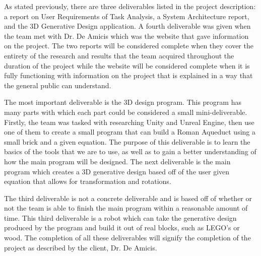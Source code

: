 \documentclass[letterpaper,draftclsnofoot,onecolumn,10 pt]{IEEEtran}
\begin{document}
As stated previously, there are three deliverables listed in the project description: a report on User Requirements of Task Analysis, a System Architecture report, and the 3D Generative Design application. A fourth deliverable was given when the team met with Dr. De Amicis which was the website that gave information on the project. The two reports will be considered complete when they cover the entirety of the research and results that the team acquired throughout the duration of the project while the website will be considered complete when it is fully functioning with information on the project that is explained in a way that the general public can understand. \par
The most important deliverable is the 3D design program. This program has many parts with which each part could be considered a small mini-deliverable. Firstly, the team was tasked with researching Unity and Unreal Engine, then use one of them to create a small program that can build a Roman Aqueduct  using a small brick and a given equation. The purpose of this deliverable is to learn the basics of the tools that we are to use, as well as to gain a better understanding of how the main program will be designed. The next deliverable is the main program which creates a 3D generative design based off of the user given equation that allows for transformation and rotations. \par
The third deliverable is not a concrete deliverable and is based off of whether or not the team is able to finish the main program within a reasonable amount of time. This third deliverable is a robot which can take the generative design produced by the program and build it out of real blocks, such as LEGO’s or wood. The completion of all these deliverables will signify the completion of the project as described by the client, Dr. De Amicis. 
\end{document}
